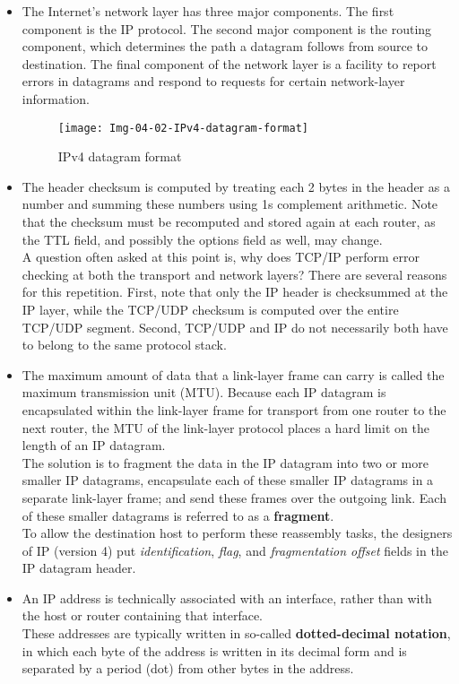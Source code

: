 \begin{itemize}
\item
The Internet's network layer has three major components. The first component is the IP protocol. The second major component is the routing component, which determines the path a datagram follows from source to destination. The final component of the network layer is a facility to report errors in datagrams and respond to requests for certain network-layer information.

\begin{figure}[h]
\texttt{[image: Img-04-02-IPv4-datagram-format]}
\centering
\caption{IPv4 datagram format}
\label{fig:fig-04-02}
\end{figure}

\item
The header checksum is computed by treating each 2 bytes in the header as a number and summing these numbers using 1s complement arithmetic. Note that the checksum must be recomputed and stored again at each router, as the TTL field, and possibly the options field as well, may change.\\
A question often asked at this point is, why does TCP/IP perform error checking at both the transport and network layers? There are several reasons for this repetition. First, note that only the IP header is checksummed at the IP layer, while the TCP/UDP checksum is computed over the entire TCP/UDP segment. Second, TCP/UDP and IP do not necessarily both have to belong to the same protocol stack.

\item
The maximum amount of data that a link-layer frame can carry is called the maximum transmission unit (MTU). Because each IP datagram is encapsulated within the link-layer frame for transport from one router to the next router, the MTU of the link-layer protocol places a hard limit on the length of an IP datagram.\\
The solution is to fragment the data in the IP datagram into two or more smaller IP datagrams, encapsulate each of these smaller IP datagrams in a separate link-layer frame; and send these frames over the outgoing link. Each of these smaller datagrams is referred to as a \textbf{fragment}.\\
To allow the destination host to perform these reassembly tasks, the designers of IP (version 4) put \textit{identification}, \textit{flag}, and \textit{fragmentation offset} fields in the IP datagram header.

\item
An IP address is technically associated with an interface, rather than with the host or router containing that interface.\\
These addresses are typically written in so-called \textbf{dotted-decimal notation}, in which each byte of the address is written in its decimal form and is separated by a period (dot) from other bytes in the address.


\end{itemize}
